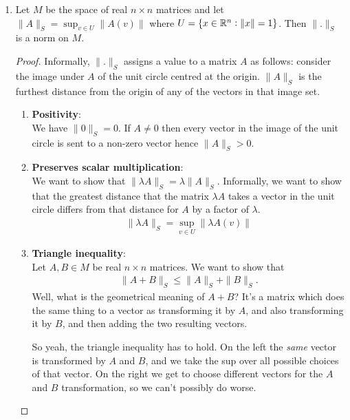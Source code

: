 \documentclass[12pt]{article}
\begin{document}
\begin{enumerate}
\item
  \begin{claim*}
    Let $M$ be the space of real $n \times n$ matrices and let $\|A\|_S = \sup_{v \in U} \|A(v)\|$
    where $U = \{x \in \mathbb{R}^n : \|x\| = 1\}$. Then $\|.\|_S$ is a norm on $M$.
  \end{claim*}
  \begin{proof}
    Informally, $\|.\|_S$ assigns a value to a matrix $A$ as follows: consider the image under $A$ of
    the unit circle centred at the origin. $\|A\|_S$ is the furthest distance from the origin of any
    of the vectors in that image set.
    \begin{enumerate}
    \item {\bf Positivity}:\\
      We have $\|0\|_S = 0$. If $A \neq 0$ then every vector in the image of the unit circle is
      sent to a non-zero vector hence $\|A\|_S > 0$.
    \item {\bf Preserves scalar multiplication}:\\
      We want to show that $\|\lambda A\|_S = \lambda \|A\|_S$. Informally, we want to show that the
      greatest distance that the matrix $\lambda A$ takes a vector in the unit circle differs from
      that distance for $A$ by a factor of $\lambda$.
      \begin{align*}
        \|\lambda A\|_S = \sup_{v \in U} \|\lambda A(v)\|
      \end{align*}
        \todo{}
      \item {\bf Triangle inequality}:\\
        Let $A, B \in M$ be real $n \times n$ matrices. We want to show that
      \begin{align*}
        \|A + B\|_S \leq \|A\|_S + \|B\|_S.
      \end{align*}
      Well, what is the geometrical meaning of $A + B$? It's a matrix which does the same thing to
      a vector as transforming it by $A$, and also transforming it by $B$, and then adding the two
      resulting vectors.

      So yeah, the triangle inequality has to hold. On the left the {\it same} vector is
      transformed by $A$ and $B$, and we take the sup over all possible choices of that vector. On
      the right we get to choose different vectors for the $A$ and $B$ transformation, so we can't
      possibly do worse.


\end{enumerate}
\end{proof}
\end{enumerate}
\end{document}
